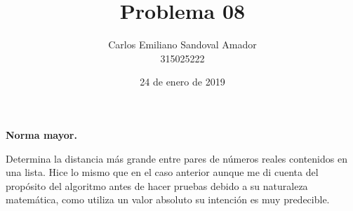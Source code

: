 \documentclass[letterpaper, 12pt, oneside]{article}%
\title{Problema 08}
\author{Carlos Emiliano Sandoval Amador \\ 315025222}
\date{24 de enero de 2019}
\begin{document}
	\maketitle
	\begin{center}
		\textbf{\large Norma mayor.}
	\end{center}
	Determina la distancia más grande entre pares de números reales contenidos en una lista. Hice lo mismo que en el caso anterior aunque me di cuenta del propósito del algoritmo antes de hacer pruebas debido a su naturaleza matemática, como utiliza un valor absoluto su intención es muy predecible.
\end{document}

